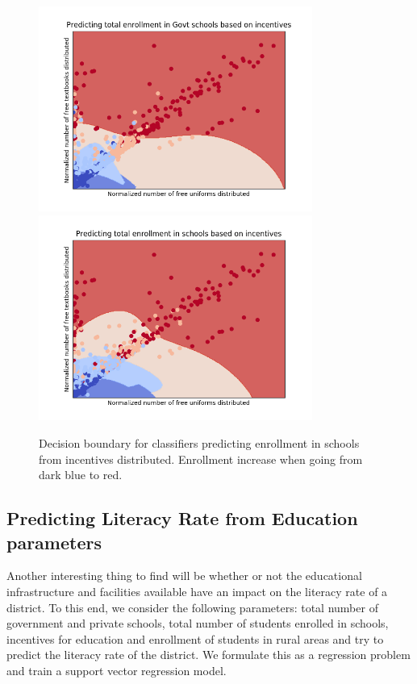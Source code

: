 \documentclass[twoside]{article}
\begin{document}
\begin{figure}[h]
    \centering
    \includegraphics[width=0.8\textwidth]{Incentives-vs-govt-enrollment.png}
     \includegraphics[width=0.8\textwidth]{Incentives-vs-total-enrollment.png}
    \caption{Decision boundary for classifiers predicting enrollment in schools from incentives distributed. Enrollment increase when going from dark blue to red.}
    \label{fig:decision_boundary_enrollment}
\end{figure}

\subsection*{Predicting Literacy Rate from Education parameters}
Another interesting thing to find will be whether or not the educational infrastructure and facilities available have an impact on the literacy rate of a district. To this end, we consider the following parameters: total number of government and private schools, total number of students enrolled in schools, incentives for education and enrollment of students in rural areas and try to predict the literacy rate of the district. We formulate this as a regression problem and train a support vector regression model.\\
\end{document}
